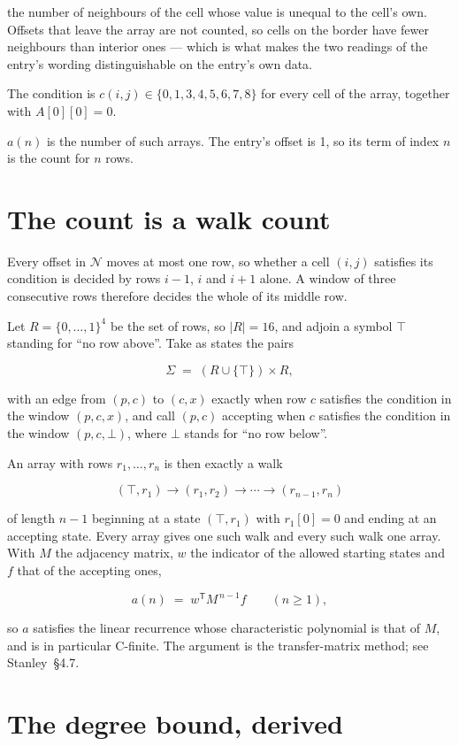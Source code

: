 \documentclass[11pt]{article}
\theoremstyle{definition}
\begin{document}
the number of neighbours of the cell whose value is unequal to the cell's own. Offsets that leave the array are not counted, so cells on the border have fewer neighbours than interior ones --- which is what makes the two readings of the entry's wording distinguishable on the entry's own data.

The condition is $c(i,j) \in \{0, 1, 3, 4, 5, 6, 7, 8\}$ for every cell of the array, together with $A[0][0]=0$.

$a(n)$ is the number of such arrays. The entry's offset is 1, so its term of index $n$ is the count for $n$ rows.

\section{The count is a walk count}

Every offset in $\mathcal{N}$ moves at most one row, so whether a cell $(i,j)$ satisfies its condition is decided by rows $i-1$, $i$ and $i+1$ alone. A window of three consecutive rows therefore decides the whole of its middle row.

Let $R = \{0,\dots,1\}^{4}$ be the set of rows, so $|R| = 16$, and adjoin a symbol $\top$ standing for ``no row above''. Take as states the pairs

\[\Sigma \;=\; (R \cup \{\top\}) \times R,\]

with an edge from $(p,c)$ to $(c,x)$ exactly when row $c$ satisfies the condition in the window $(p,c,x)$, and call $(p,c)$ accepting when $c$ satisfies the condition in the window $(p,c,\bot)$, where $\bot$ stands for ``no row below''.

An array with rows $r_1,\dots,r_n$ is then exactly a walk

\[(\top,r_1) \to (r_1,r_2) \to \cdots \to (r_{n-1},r_n)\]

of length $n-1$ beginning at a state $(\top,r_1)$ with $r_1[0]=0$ and ending at an accepting state. Every array gives one such walk and every such walk one array. With $M$ the adjacency matrix, $w$ the indicator of the allowed starting states and $f$ that of the accepting ones,

\[a(n) \;=\; w^{\mathsf T} M^{\,n-1} f \qquad (n \ge 1),\]

so $a$ satisfies the linear recurrence whose characteristic polynomial is that of $M$, and is in particular C-finite. The argument is the transfer-matrix method; see Stanley~\S4.7.

\section{The degree bound, derived}
\end{document}
